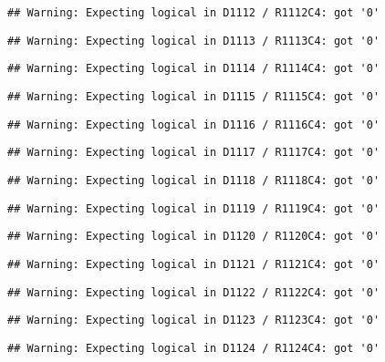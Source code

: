 \documentclass[
]{article}
\begin{document}
\begin{verbatim}
## Warning: Expecting logical in D1112 / R1112C4: got '0'
\end{verbatim}

\begin{verbatim}
## Warning: Expecting logical in D1113 / R1113C4: got '0'
\end{verbatim}

\begin{verbatim}
## Warning: Expecting logical in D1114 / R1114C4: got '0'
\end{verbatim}

\begin{verbatim}
## Warning: Expecting logical in D1115 / R1115C4: got '0'
\end{verbatim}

\begin{verbatim}
## Warning: Expecting logical in D1116 / R1116C4: got '0'
\end{verbatim}

\begin{verbatim}
## Warning: Expecting logical in D1117 / R1117C4: got '0'
\end{verbatim}

\begin{verbatim}
## Warning: Expecting logical in D1118 / R1118C4: got '0'
\end{verbatim}

\begin{verbatim}
## Warning: Expecting logical in D1119 / R1119C4: got '0'
\end{verbatim}

\begin{verbatim}
## Warning: Expecting logical in D1120 / R1120C4: got '0'
\end{verbatim}

\begin{verbatim}
## Warning: Expecting logical in D1121 / R1121C4: got '0'
\end{verbatim}

\begin{verbatim}
## Warning: Expecting logical in D1122 / R1122C4: got '0'
\end{verbatim}

\begin{verbatim}
## Warning: Expecting logical in D1123 / R1123C4: got '0'
\end{verbatim}

\begin{verbatim}
## Warning: Expecting logical in D1124 / R1124C4: got '0'
\end{verbatim}
\end{document}
